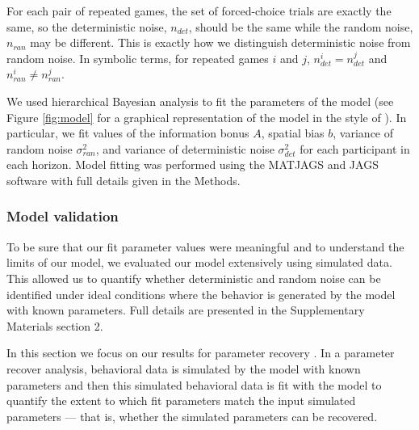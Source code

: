 \documentclass[12pt]{article}
\begin{document}
{%

For each pair of repeated games, the set of forced-choice trials are exactly the same, so the deterministic noise, $n_{det}$, should be the same while the random noise, $n_{ran}$ may be different. This is exactly how we distinguish deterministic noise from random noise. In symbolic terms, for repeated games $i$ and $j$,  $n_{det}^i=n_{det}^j$  and $n_{ran}^i \neq n_{ran}^j$.

We used hierarchical Bayesian analysis to fit the parameters of the model (see Figure \ref{fig:model} for a graphical representation of the model in the style of \cite{lee2014}). In particular, we fit values of the information bonus $A$, spatial bias $b$, variance of random noise $\sigma_{ran}^2$, and variance of deterministic noise $\sigma_{det}^2$ for each participant in each horizon. Model fitting was performed using the MATJAGS and JAGS software \citep{jags, matjags} with full details given in the Methods.  

\subsubsection*{Model validation}
To be sure that our fit parameter values were meaningful and to understand the limits of our model, we evaluated our model extensively using simulated data. This allowed us to quantify whether deterministic and random noise can be identified under ideal conditions where the behavior is generated by the model with known parameters. Full details are presented in the Supplementary Materials section 2. 
	
In this section we focus on our results for parameter recovery \citep{Wilson2019}. In a parameter recover analysis, behavioral data is simulated by the model with known parameters and then this simulated behavioral data is fit with the model to quantify the extent to which fit parameters match the input simulated parameters --- that is, whether the simulated parameters can be recovered.  
	
}
\end{document}
